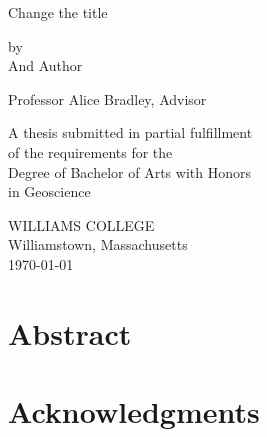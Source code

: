 \documentclass[12pt, oneside]{book}
\begin{document}
\begin{titlepage}
\begin{center}

\vspace*{2cm}

{\huge Change the title} %

\vspace{2cm}

{\large by\\And Author}

\vspace{2cm}
{Professor Alice Bradley, Advisor}

\vfill

A thesis submitted in partial fulfillment\\
of the requirements for the\\
Degree of Bachelor of Arts with Honors\\
in Geoscience

\vspace*{3cm}

WILLIAMS COLLEGE\\
Williamstown, Massachusetts\\
\today %
\end{center}
\end{titlepage}


\frontmatter 


\onehalfspacing

\chapter{Abstract}


\chapter{Acknowledgments}

\end{document}
